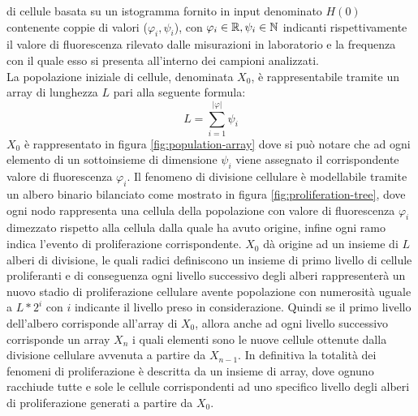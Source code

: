 di cellule basata su un istogramma fornito in input denominato $H(0)$
contenente coppie di valori ($\varphi_{i}, \psi_{i}$),
con $\varphi_{i} \in \mathbb{R}, \psi_{i} \in \mathbb{N}$ indicanti rispettivamente il
valore di fluorescenza rilevato dalle misurazioni in laboratorio e
la frequenza con il quale esso si presenta all'interno dei campioni analizzati.
\\
La popolazione iniziale di cellule, denominata $X_{0}$, è rappresentabile
tramite un array di
lunghezza $L$ pari alla seguente formula: 
$$L = \sum_{i=1}^{|\varphi|} \psi_{i}$$
$X_{0}$ è rappresentato in figura \ref{fig:population-array} dove si
può notare che ad ogni elemento
di un sottoinsieme di dimensione $\psi_{i}$ viene assegnato il corrispondente
valore di fluorescenza $\varphi_{i}$.
Il fenomeno di divisione cellulare è modellabile tramite un albero binario 
bilanciato
come mostrato in figura \ref{fig:proliferation-tree}, dove ogni nodo rappresenta
una cellula della popolazione con valore di fluorescenza $\varphi_{i}$
dimezzato rispetto alla cellula dalla quale ha avuto origine, infine ogni
ramo indica l'evento di proliferazione corrispondente.
$X_{0}$ dà origine ad un insieme di $L$ alberi di
divisione, le quali radici definiscono un insieme di primo livello di cellule
proliferanti e di conseguenza ogni livello successivo degli alberi rappresenterà
un nuovo stadio di proliferazione cellulare avente popolazione con numerosità
uguale a $L * 2^{i}$ con $i$ indicante il livello preso in considerazione.
Quindi se il primo livello dell'albero corrisponde all'array di $X_{0}$,
allora anche ad ogni livello successivo corrisponde un array $X_{n}$ i quali
elementi sono le nuove cellule ottenute dalla divisione cellulare avvenuta a 
partire da $X_{n-1}$.
In definitiva la totalità dei fenomeni di proliferazione è descritta da un
insieme di array, dove ognuno racchiude tutte e sole le cellule
corrispondenti ad uno specifico livello degli alberi di proliferazione generati
a partire da $X_{0}$.
